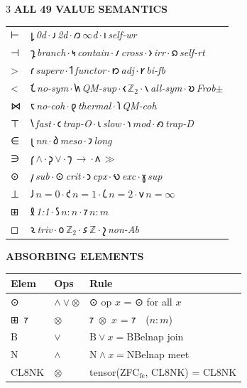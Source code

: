 \documentclass[7pt]{article}
\renewcommand{\arraystretch}{0.85}
\newcommand{\shead}[1]{%
  \vspace{2pt}%
  {\fontsize{6pt}{6.5pt}\selectfont\sffamily\bfseries\textcolor{hd}{\MakeUppercase{#1}}}%
  \vspace{0.3pt}\newline{\color{rl}\hrule height 0.2pt}\vspace{1pt}%
}
\newcommand{\sh}[1]{{\Large\shavfont #1}}
\newcommand{\prim}[1]{{\Large\igprimfont #1}}
\begin{document}
\begin{multicols}{3}
\vspace{1pt}
\shead{All 49 Value Semantics}
{\fontsize{5.8pt}{6.8pt}\selectfont
\renewcommand{\arraystretch}{0.85}
\begin{tabular}{@{}l@{\,}p{63mm}@{}}
\prim{⊢} & \sh{𐑛}\,\textit{0d}\,$\cdot$\,\sh{𐑨}\,\textit{2d}\,$\cdot$\,\sh{𐑼}\,\textit{$\infty$d}\,$\cdot$\,\sh{𐑦}\,\textit{self-wr} \\
\prim{⊣} & \sh{𐑡}\,\textit{branch}\,$\cdot$\,\sh{𐑰}\,\textit{contain}\,$\cdot$\,\sh{𐑥}\,\textit{cross}\,$\cdot$\,\sh{𐑶}\,\textit{irr}\,$\cdot$\,\sh{𐑸}\,\textit{self-rt} \\
\prim{>} & \sh{𐑩}\,\textit{superv}\,$\cdot$\,\sh{𐑑}\,\textit{functor}\,$\cdot$\,\sh{𐑽}\,\textit{adj}\,$\cdot$\,\sh{𐑾}\,\textit{bi-fb} \\
\prim{<} & \sh{𐑗}\,\textit{no-sym}\,$\cdot$\,\sh{𐑿}\,\textit{QM-sup}\,$\cdot$\,\sh{𐑬}\,\textit{$\mathbb{Z}_2$}\,$\cdot$\,\sh{𐑯}\,\textit{all-sym}\,$\cdot$\,\sh{𐑹}\,\textit{Frob$\pm$} \\
\prim{⋈} & \sh{𐑱}\,\textit{no-coh}\,$\cdot$\,\sh{𐑞}\,\textit{thermal}\,$\cdot$\,\sh{𐑐}\,\textit{QM-coh} \\
\prim{⊤} & \sh{𐑘}\,\textit{fast}\,$\cdot$\,\sh{𐑤}\,\textit{trap-O}\,$\cdot$\,\sh{𐑧}\,\textit{slow}\,$\cdot$\,\sh{𐑪}\,\textit{mod}\,$\cdot$\,\sh{𐑺}\,\textit{trap-D} \\
\prim{∈} & \sh{𐑚}\,\textit{nn}\,$\cdot$\,\sh{𐑔}\,\textit{meso}\,$\cdot$\,\sh{𐑲}\,\textit{long} \\
\prim{∋} & \sh{𐑝}\,$\wedge$\,$\cdot$\,\sh{𐑜}\,$\vee$\,$\cdot$\,\sh{𐑠}\,$\to$\,$\cdot$\,\sh{𐑵}\,$\gg$ \\
\prim{⊙} & \sh{𐑢}\,\textit{sub}\,$\cdot$\,{\Large⊙}\,\textit{crit}\,$\cdot$\,\sh{𐑮}\,\textit{cpx}\,$\cdot$\,\sh{𐑻}\,\textit{exc}\,$\cdot$\,\sh{𐑣}\,\textit{sup} \\
\prim{⊥} & \sh{𐑓}\,$n=0$\,$\cdot$\,\sh{𐑒}\,$n=1$\,$\cdot$\,\sh{𐑖}\,$n=2$\,$\cdot$\,\sh{𐑫}\,$n=\infty$ \\
\prim{⊞} & \sh{𐑙}\,\textit{1:1}\,$\cdot$\,\sh{𐑕}\,$n:n$\,$\cdot$\,\sh{𐑳}\,$n:m$ \\
\prim{◻} & \sh{𐑷}\,\textit{triv}\,$\cdot$\,\sh{𐑴}\,$\mathbb{Z}_2$\,$\cdot$\,\sh{𐑭}\,$\mathbb{Z}$\,$\cdot$\,\sh{𐑟}\,\textit{non-Ab} \\
\end{tabular}
}

\vspace{1pt}
\shead{Absorbing Elements}
{\fontsize{6.5pt}{7.8pt}\selectfont
\begin{tabular}{@{}l@{\;}l@{\;}p{44mm}@{}}
\toprule
\textbf{Elem} & \textbf{Ops} & \textbf{Rule} \\
\midrule
\sh{⊙} & $\wedge\vee\otimes$ & \sh{⊙} op $x$ = \sh{⊙} for all $x$ \\
\sh{⊞}~\sh{𐑳} & $\otimes$ & \sh{𐑳}~$\otimes$~$x$ = \sh{𐑳}~~($n:m$) \\
B & $\vee$ & $\mathrm{B}\vee x = \mathrm{B}$\enspace Belnap join \\
N & $\wedge$ & $\mathrm{N}\wedge x = \mathrm{N}$\enspace Belnap meet \\
CL8NK & $\otimes$ & tensor(ZFC$_\mathrm{fe}$, CL8NK) = CL8NK \\
\bottomrule
\end{tabular}
}


\end{multicols}
\end{document}
